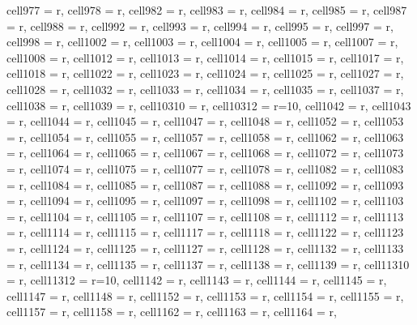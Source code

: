 \begin{longtblr}[
  caption = {Linear model estimating all the considered metrics in every alternative scenario.}
]
{  cell{97}{7} = {r},
  cell{97}{8} = {r},
  cell{98}{2} = {r},
  cell{98}{3} = {r},
  cell{98}{4} = {r},
  cell{98}{5} = {r},
  cell{98}{7} = {r},
  cell{98}{8} = {r},
  cell{99}{2} = {r},
  cell{99}{3} = {r},
  cell{99}{4} = {r},
  cell{99}{5} = {r},
  cell{99}{7} = {r},
  cell{99}{8} = {r},
  cell{100}{2} = {r},
  cell{100}{3} = {r},
  cell{100}{4} = {r},
  cell{100}{5} = {r},
  cell{100}{7} = {r},
  cell{100}{8} = {r},
  cell{101}{2} = {r},
  cell{101}{3} = {r},
  cell{101}{4} = {r},
  cell{101}{5} = {r},
  cell{101}{7} = {r},
  cell{101}{8} = {r},
  cell{102}{2} = {r},
  cell{102}{3} = {r},
  cell{102}{4} = {r},
  cell{102}{5} = {r},
  cell{102}{7} = {r},
  cell{102}{8} = {r},
  cell{103}{2} = {r},
  cell{103}{3} = {r},
  cell{103}{4} = {r},
  cell{103}{5} = {r},
  cell{103}{7} = {r},
  cell{103}{8} = {r},
  cell{103}{9} = {r},
  cell{103}{10} = {r},
  cell{103}{12} = {r=10}{},
  cell{104}{2} = {r},
  cell{104}{3} = {r},
  cell{104}{4} = {r},
  cell{104}{5} = {r},
  cell{104}{7} = {r},
  cell{104}{8} = {r},
  cell{105}{2} = {r},
  cell{105}{3} = {r},
  cell{105}{4} = {r},
  cell{105}{5} = {r},
  cell{105}{7} = {r},
  cell{105}{8} = {r},
  cell{106}{2} = {r},
  cell{106}{3} = {r},
  cell{106}{4} = {r},
  cell{106}{5} = {r},
  cell{106}{7} = {r},
  cell{106}{8} = {r},
  cell{107}{2} = {r},
  cell{107}{3} = {r},
  cell{107}{4} = {r},
  cell{107}{5} = {r},
  cell{107}{7} = {r},
  cell{107}{8} = {r},
  cell{108}{2} = {r},
  cell{108}{3} = {r},
  cell{108}{4} = {r},
  cell{108}{5} = {r},
  cell{108}{7} = {r},
  cell{108}{8} = {r},
  cell{109}{2} = {r},
  cell{109}{3} = {r},
  cell{109}{4} = {r},
  cell{109}{5} = {r},
  cell{109}{7} = {r},
  cell{109}{8} = {r},
  cell{110}{2} = {r},
  cell{110}{3} = {r},
  cell{110}{4} = {r},
  cell{110}{5} = {r},
  cell{110}{7} = {r},
  cell{110}{8} = {r},
  cell{111}{2} = {r},
  cell{111}{3} = {r},
  cell{111}{4} = {r},
  cell{111}{5} = {r},
  cell{111}{7} = {r},
  cell{111}{8} = {r},
  cell{112}{2} = {r},
  cell{112}{3} = {r},
  cell{112}{4} = {r},
  cell{112}{5} = {r},
  cell{112}{7} = {r},
  cell{112}{8} = {r},
  cell{113}{2} = {r},
  cell{113}{3} = {r},
  cell{113}{4} = {r},
  cell{113}{5} = {r},
  cell{113}{7} = {r},
  cell{113}{8} = {r},
  cell{113}{9} = {r},
  cell{113}{10} = {r},
  cell{113}{12} = {r=10}{},
  cell{114}{2} = {r},
  cell{114}{3} = {r},
  cell{114}{4} = {r},
  cell{114}{5} = {r},
  cell{114}{7} = {r},
  cell{114}{8} = {r},
  cell{115}{2} = {r},
  cell{115}{3} = {r},
  cell{115}{4} = {r},
  cell{115}{5} = {r},
  cell{115}{7} = {r},
  cell{115}{8} = {r},
  cell{116}{2} = {r},
  cell{116}{3} = {r},
  cell{116}{4} = {r},
}
\end{longtblr}
